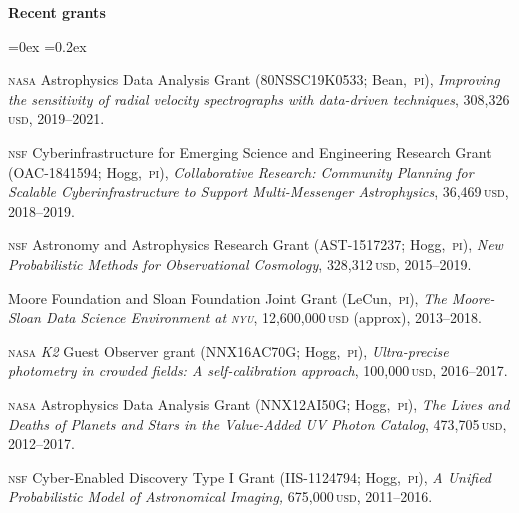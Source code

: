 \documentclass[12pt,letterpaper]{article}
\newcommand{\satellite}[1]{\textsl{#1}}
\newcommand{\usd}[1]{{#1}\,\textsc{usd}}
\newcommand{\grantnumber}[2]{{\footnotesize{#1}}; #2,~\textsc{pi}}
\newcounter{refpubnum}
\newcommand{\hogglist}{%
    \rightmargin=0in
    \leftmargin=0.18in
    \topsep=0ex
    \partopsep=0pt
    \itemsep=0.2ex
    \parsep=0pt
    \itemindent=-1.0\leftmargin
    \listparindent=0.0\leftmargin
    \settowidth{\labelsep}{~}
    \usecounter{refpubnum}
  }
\newcommand{\hoggheading}[1]{\addvspace{1ex}\pagebreak[2]%
  \par\textbf{#1}}
\begin{document}
\hoggheading{Recent grants}
\begin{list}{}{\hogglist}
\item
\textsc{nasa} Astrophysics Data Analysis Grant
(\grantnumber{80NSSC19K0533}{Bean}),
\textit{Improving the sensitivity of radial velocity spectrographs with
data-driven techniques},
\usd{308,326}, 2019--2021.
\item
\textsc{nsf} Cyberinfrastructure for Emerging Science and Engineering Research Grant
(\grantnumber{OAC-1841594}{Hogg}),
\textit{Collaborative Research: Community Planning for Scalable Cyberinfrastructure to Support Multi-Messenger Astrophysics},
\usd{36,469}, 2018--2019.
\item
\textsc{nsf} Astronomy and Astrophysics Research Grant
(\grantnumber{AST-1517237}{Hogg}),
\textit{New Probabilistic Methods for Observational Cosmology},
\usd{328,312}, 2015--2019.
\item
Moore Foundation and Sloan Foundation Joint Grant
(LeCun,~\textsc{pi}),
\textit{The Moore-Sloan Data Science Environment at \textsc{nyu}},
\usd{12,600,000} (approx), 2013--2018.
\item
\textsc{nasa} \satellite{K2} Guest Observer grant
(\grantnumber{NNX16AC70G}{Hogg}),
\textit{Ultra-precise photometry in crowded fields: A self-calibration approach},
\usd{100,000}, 2016--2017.
\item
\textsc{nasa} Astrophysics Data Analysis Grant
(\grantnumber{NNX12AI50G}{Hogg}),
\textit{The Lives and Deaths of Planets and Stars in the Value-Added UV Photon Catalog},
\usd{473,705}, 2012--2017.
\item
\textsc{nsf} Cyber-Enabled Discovery Type I Grant
(\grantnumber{IIS-1124794}{Hogg}),
\textit{A Unified Probabilistic Model of Astronomical Imaging,}
\usd{675,000}, 2011--2016.
\end{list}
\end{document}

